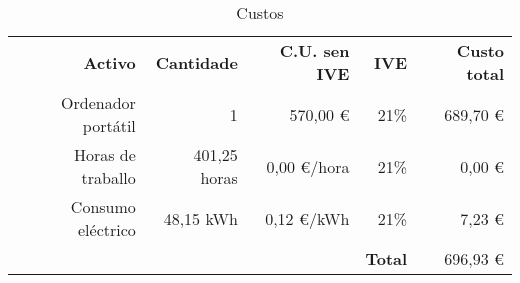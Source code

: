 \begin{table}[htbp]
  \centering
    \begin{tabular}{rrrrr}
    \textbf{Activo} & \textbf{Cantidade} & \textbf{C.U. sen IVE} & \textbf{IVE} & \textbf{Custo total} \\
    Ordenador portátil & 1     & 570,00 \euro & 21\%  & 689,70 \euro \\
    Horas de traballo & 401,25 horas & 0,00 \euro/hora & 21\%  & 0,00 \euro \\
    Consumo eléctrico & 48,15 kWh & 0,12 \euro/kWh & 21\%  & 7,23 \euro \\
          &       &       & \textbf{Total} & 696,93 \euro \\
    \end{tabular}%
		\caption{Custos}
  \label{tab:custosLabel}%
\end{table}%

